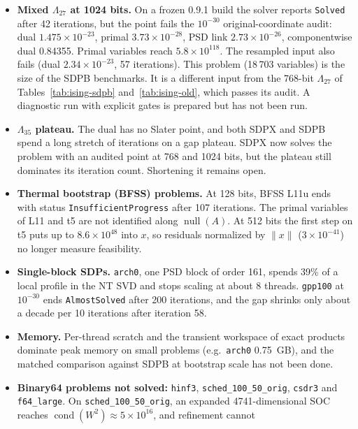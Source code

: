 \documentclass[11pt]{article}
\newcommand{\code}[1]{\texttt{#1}}
\begin{document}
\begin{itemize}
  \item \textbf{Mixed $\Lambda_{27}$ at 1024 bits.} On a frozen 0.9.1 build the
    solver reports \code{Solved} after 42 iterations, but the point fails the
    $10^{-30}$ original-coordinate audit: dual $1.475\times10^{-23}$, primal
    $3.73\times10^{-28}$, PSD link $2.73\times10^{-26}$, componentwise dual
    0.84355. Primal variables reach $5.8\times10^{118}$. The resampled input
    also fails (dual $2.34\times10^{-23}$, 57 iterations). This problem
    (18\,703 variables) is the size of the SDPB benchmarks. It is a
    different input from the 768-bit $\Lambda_{27}$ of
    Tables~\ref{tab:ising-sdpb} and~\ref{tab:ising-old}, which passes its
    audit. A diagnostic run with explicit gates is prepared but has not been
    run.
  \item \textbf{$\Lambda_{35}$ plateau.} The dual has no Slater point, and both
    SDPX and SDPB spend a long stretch of iterations on a gap plateau. SDPX
    now solves the problem with an audited point at 768 and 1024 bits, but
    the plateau still dominates its iteration count. Shortening it remains
    open.
  \item \textbf{Thermal bootstrap (BFSS) problems.} At 128 bits, BFSS L11u
    ends with status \code{InsufficientProgress} after 107 iterations. The primal variables of
    L11 and t5 are not identified along $\operatorname{null}(A)$. At 512 bits
    the first step on t5 puts up to $8.6\times10^{48}$ into $x$, so residuals
    normalized by $\|x\|$ ($3\times10^{-41}$) no longer measure
    feasibility.
  \item \textbf{Single-block SDPs.} \code{arch0}, one PSD block of order
    161, spends 39\% of a local profile in the NT SVD and stops scaling at
    about 8 threads. \code{gpp100} at
    $10^{-30}$ ends \code{AlmostSolved} after 200 iterations, and the gap
    shrinks only about a decade per 10 iterations after iteration 58.
  \item \textbf{Memory.} Per-thread scratch and the transient workspace of
    exact products dominate peak memory on small problems (e.g.\ \code{arch0}
    0.75~GB), and the matched comparison against SDPB at bootstrap scale has
    not been done.
  \item \textbf{Binary64 problems not solved:} \code{hinf3},
    \code{sched\_100\_50\_orig}, \code{csdr3} and \code{f64\_large}. On
    \code{sched\_100\_50\_orig}, an expanded 4741-dimensional SOC reaches
    $\operatorname{cond}(W^2)\approx5\times10^{16}$, and refinement cannot

\end{itemize}
\end{document}
